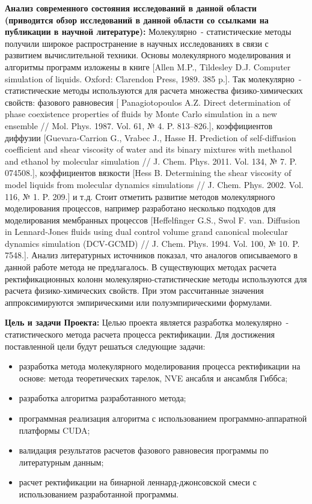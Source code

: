 \textbf{Анализ современного состояния исследований в данной области (приводится обзор исследований в данной области со ссылками на публикации в научной литературе):}
Молекулярно~- статистические методы получили широкое распространение в научных исследованиях в связи с развитием вычислительной техники. Основы молекулярного моделирования и алгоритмы программ изложены в книге [Allen M.P., Tildesley D.J. Computer simulation of liquids. Oxford: Clarendon Press, 1989. 385 p.]. Так молекулярно~- статистические методы используются для расчета множества физико-химических свойств: фазового равновесия [ Panagio\-topoulos A.Z. Direct determination of phase coexistence properties of fluids by Monte Carlo simulation in a new ensemble // Mol. Phys. 1987. Vol. 61, № 4. P. 813–826.], коэффициентов диффузии [Guevara-Carrion G., Vrabec J., Hasse H. Prediction of self-diffusion coefficient and shear viscosity of water and its binary mixtures with methanol and ethanol by molecular simulation // J. Chem. Phys. 2011. Vol. 134, № 7. P. 074508.], коэффициентов вязкости [Hess B. Determining the shear viscosity of model liquids from molecular dynamics simulations // J. Chem. Phys. 2002. Vol. 116, № 1. P. 209.] и т.д. Стоит отметить развитие методов молекулярного моделирования процессов, например разработано несколько подходов для моделирования мембранных процессов [Heffelfinger G.S., Swol F. van. Diffusion in Lennard-Jones fluids using dual control volume grand canonical molecular dynamics simulation (DCV-GCMD) // J. Chem. Phys. 1994. Vol. 100, № 10. P. 7548.].
Анализ литературных источников показал, что аналогов описываемого в данной работе метода не предлагалось. В существующих методах расчета ректификационных колонн молекулярно-статистические методы используются для расчета физико-химических свойств. При этом рассчитанные значения аппроксимируются эмпирическими или полуэмпирическими формулами.

\textbf{Цель и задачи Проекта:}
Целью проекта является разработка молекулярно~- статистического метода расчета процесса ректификации. Для достижения поставленной цели будут решаться следующие задачи:
\begin{itemize}
	\item разработка метода молекулярного моделирования процесса ректификации на основе: метода теоретических тарелок, NVE ансабля и ансамбля Гиббса;
	\item разработка алгоритма разработанного метода;
	\item программная реализация алгоритма с использованием программно-аппаратной платформы CUDA;
	\item валидация результатов расчетов фазового равновесия программы по литературным данным;
	\item расчет ректификации на бинарной леннард-джонсовской смеси с использованием разработанной программы.
\end{itemize}

